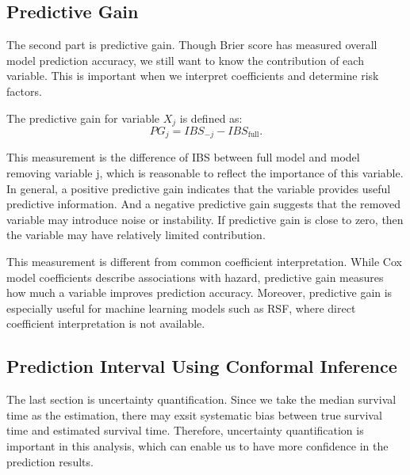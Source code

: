 \documentclass[11pt]{article}
\begin{document}
\subsection{Predictive Gain}

The second part is predictive gain. Though Brier score has measured overall model prediction accuracy, we still want to know the contribution of each variable. This is important when we interpret coefficients and determine risk factors.


The predictive gain for variable $X_j$ is defined as:
\[
PG_j = IBS_{-j} - IBS_{\text{full}}.
\]

This measurement is the difference of IBS between full model and model removing variable j, which is reasonable to reflect the importance of this variable. In general, a positive predictive gain indicates that the variable provides useful predictive information. And a negative predictive gain suggests that the removed variable may introduce noise or instability. If predictive gain is close to zero, then the variable may have relatively limited contribution. 

This measurement is different from common coefficient interpretation. While Cox model coefficients describe associations with hazard, predictive gain measures how much a variable improves prediction accuracy. Moreover, predictive gain is especially useful for machine learning models such as RSF, where direct coefficient interpretation is not available.

\subsection{Prediction Interval Using Conformal Inference}

The last section is uncertainty quantification. Since we take the median survival time as the estimation, there may exsit systematic bias between true survival time and estimated survival time. Therefore, uncertainty quantification is important in this analysis, which can enable us to have more confidence in the prediction results.
\end{document}
